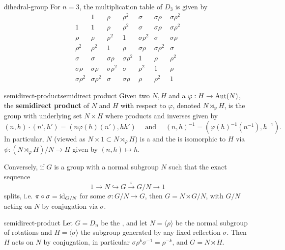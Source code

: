 \begin{example}{dihedral-group}
    For $n = 3$, the multiplication table of $D_3$ is given by
    \[ \begin{array}{c||c|c|c|c|c|c} 
           & 1 & \rho & \rho^2 & \sigma & \sigma \rho & \sigma \rho^2 \\ \hline \hline
         1 & 1 & \rho & \rho^2 & \sigma & \sigma \rho & \sigma \rho^2 \\ \hline
         \rho & \rho & \rho^2 & 1 & \sigma \rho^2 & \sigma & \sigma \rho \\ \hline
         \rho^2 & \rho^2 & 1 & \rho & \sigma \rho & \sigma \rho^2 & \sigma \\ \hline
         \sigma & \sigma & \sigma \rho & \sigma \rho^2 & 1 & \rho & \rho^2 \\ \hline
         \sigma \rho & \sigma \rho & \sigma \rho^2 & \sigma & \rho^2 & 1 & \rho \\ \hline
         \sigma \rho^2 & \sigma \rho^2 & \sigma & \sigma \rho & \rho & \rho^2 & 1
    \end{array} \]
\end{example}

\begin{topic}{semidirect-product}{semidirect product}
    Given two  $N, H$ and a  $\varphi : H \to \textup{Aut}(N)$, the \textbf{semidirect product} of $N$ and $H$ with respect to $\varphi$, denoted $N \rtimes_\varphi H$, is the group with underlying set $N \times H$ where products and inverses given by
    \[ (n, h) \cdot (n', h') = (n \varphi(h)(n'), h h') \quad \text{ and } \quad (n, h)^{-1} = (\varphi(h)^{-1}(n^{-1}), h^{-1}) . \]
    In particular, $N$ (viewed as $N \times 1 \subset N \rtimes_\varphi H$) is a  and the  is isomorphic to $H$ via $\psi : (N \rtimes_\varphi H)/N \to H$ given by $(n, h) \mapsto h$.
    
    Conversely, if $G$ is a group with a normal subgroup $N$ such that the exact sequence
    \[ 1 \to N \hookrightarrow G \xrightarrow{\pi} G/N \to 1 \]
    splits, i.e. $\pi \circ \sigma = \textup{id}_{G/N}$ for some $\sigma : G/N \to G$, then $G = N \rtimes G/N$, with $G/N$ acting on $N$ by conjugation via $\sigma$.
\end{topic}

\begin{example}{semidirect-product}
    Let $G = D_{n}$ be the , and let $N = \langle \rho \rangle$ be the normal subgroup of rotations and $H = \langle \sigma \rangle$ the subgroup generated by any fixed reflection $\sigma$. Then $H$ acts on $N$ by conjugation, in particular $\sigma \rho^k \sigma^{-1} = \rho^{-k}$, and $G = N \rtimes H$.
\end{example}

